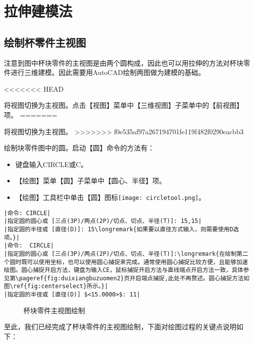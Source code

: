 \section{拉伸建模法}
\subsection{绘制杯零件主视图}
注意到图中杯块零件的主视图是由两个圆构成，因此也可以用拉伸的方法对杯块零件进行三维建模。因此需要用AutoCAD绘制两图做为建模的基础。
\begin{procedure}
<<<<<<< HEAD
\item 将视图切换为主视图。点击【视图】菜单中【三维视图】子菜单中的【前视图】项。
=======
\item 将视图切换为主视图。
>>>>>>> f0e535af97a267194701fe119f482f0290eacbb3
\item 绘制块零件图中的圆。启动【圆】命令的方法有：
\begin{itemize}
\item 键盘输入CIRCLE或C。
\item 【绘图】菜单【圆】子菜单中【圆心、半径】项。
\item 【绘图】工具栏中单击【圆】图标\texttt{[image: circletool.png]}。
\end{itemize}
\begin{lstlisting}
|命令: CIRCLE|
|指定圆的圆心或 [三点(3P)/两点(2P)/切点、切点、半径(T)]: 15,15|
|指定圆的半径或 [直径(D)]: 15\longremark{如果要以直径方式输入，则需要使用D选项。}|
|命令:  CIRCLE|
|指定圆的圆心或 [三点(3P)/两点(2P)/切点、切点、半径(T)]:\longremark{在绘制第二个圆时既可以使用坐标，也可以使用圆心捕捉来完成。通常使用圆心捕捉比较方便，且能够加速绘图。圆心捕捉开启方法，键盘为输入CE，鼠标捕捉开启方法与直线端点开启方法一致，具体参见第\pageref{fig:duixiangbuzuomen2}页开启端点捕捉,此处不再赘述。圆心捕捉方法如图\ref{fig:centerselect}所示。}|
|指定圆的半径或 [直径(D)] $<15.0000>$: 11|
\end{lstlisting}
\begin{figure}[htbp]
\centering
{}\hspace{20pt}
\caption{杯块零件主视图绘制}
\end{figure}
\end{procedure}

至此，我们已经完成了杯块零件的主视图绘制，下面对绘图过程的关键点说明如下：
\showremarks

